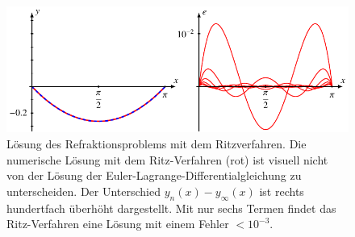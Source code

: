 %
%
%
\begin{figure}
\centering
\includegraphics{chapters/070-direkt/images/ritzloesung.pdf}
\caption{Lösung des Refraktionsproblems mit dem Ritzverfahren.
Die numerische Lösung mit dem Ritz-Verfahren (rot) ist visuell nicht von
der Lösung der Euler-Lagrange-Differentialgleichung zu unterscheiden.
Der Unterschied $y_n(x)-y_\infty(x)$ ist rechts hundertfach überhöht
dargestellt.
Mit nur sechs Termen findet das Ritz-Verfahren eine Lösung mit einem
Fehler $<10^{-3}$.
\label{buch:direkt:ritz:fig:ritzloesung}}
\end{figure}
